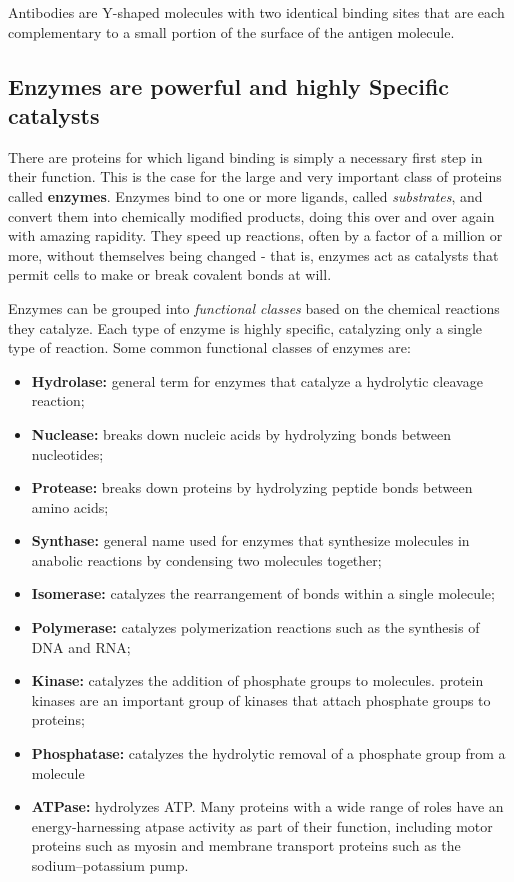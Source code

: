 Antibodies are Y-shaped molecules with two identical binding sites that
are each complementary to a small portion of the surface of the antigen
molecule.

\subsection{Enzymes are powerful and highly Specific catalysts}

There are proteins for which ligand binding is simply a necessary first step
in their function. This is the case for the large and very important class
of proteins called \textbf{enzymes}. Enzymes bind to one or more ligands, called \textit{substrates},
and convert them into chemically modified products, doing this over and over again with amazing rapidity.
They speed up reactions, often by a factor of a
million or more, without themselves being changed - that is, enzymes act
as catalysts that permit cells to make or break covalent bonds at will.

Enzymes can be grouped into \textit{functional classes} based on the chemical
reactions they catalyze. Each type of enzyme is highly specific,
catalyzing only a single type of reaction. Some common functional classes of
enzymes are:

\begin{itemize}
\item \textbf{Hydrolase:} general term for enzymes that catalyze a hydrolytic cleavage reaction;
\item \textbf{Nuclease:} breaks down nucleic acids by hydrolyzing bonds between nucleotides;
\item \textbf{Protease:} breaks down proteins by hydrolyzing peptide bonds between amino acids;
\item \textbf{Synthase:} general name used for enzymes that synthesize molecules in anabolic reactions by
condensing two molecules together;
\item \textbf{Isomerase:} catalyzes the rearrangement of bonds within a single molecule;
\item \textbf{Polymerase:} catalyzes polymerization reactions such as the synthesis of DNA and RNA;
\item \textbf{Kinase:} catalyzes the addition of phosphate groups to molecules. protein kinases are an important
group of kinases that attach phosphate groups to proteins;
\item \textbf{Phosphatase:} catalyzes the hydrolytic removal of a phosphate group from a molecule
\item \textbf{ATPase:} hydrolyzes ATP. Many proteins with a wide range of roles have an energy-harnessing atpase
activity as part of their function, including motor proteins such as myosin and membrane
transport proteins such as the sodium–potassium pump.
\end{itemize}

